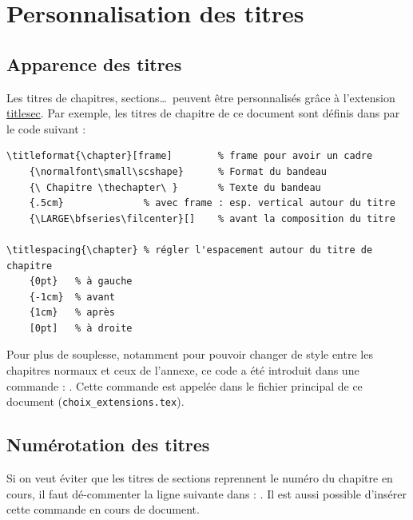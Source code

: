 	
	
	

\section{Personnalisation des titres}



\subsection{Apparence des titres}

Les titres de chapitres, sections\dots \ peuvent être personnalisés grâce à l'extension \href{http://mirror.ctan.org/macros/latex/contrib/titlesec/titlesec.pdf}{titlesec}. Par exemple, les titres de chapitre de ce document sont définis dans  par le code suivant :

\begin{verbatim}
\titleformat{\chapter}[frame]        % frame pour avoir un cadre
    {\normalfont\small\scshape}      % Format du bandeau
    {\ Chapitre \thechapter\ }       % Texte du bandeau
    {.5cm}              % avec frame : esp. vertical autour du titre
    {\LARGE\bfseries\filcenter}[]    % avant la composition du titre

\titlespacing{\chapter} % régler l'espacement autour du titre de chapitre
    {0pt}   % à gauche
    {-1cm}  % avant
    {1cm}   % après
    [0pt]   % à droite
\end{verbatim}

Pour plus de souplesse, notamment pour pouvoir changer de style entre les chapitres normaux et ceux de l'annexe, ce code a été introduit dans une commande : \texttt{\newcommand{\chapterFormat}{...}}. Cette commande est appelée dans le fichier principal de ce document (\texttt{choix_extensions.tex}).



\subsection{Numérotation des titres}

Si on veut éviter que les titres de sections reprennent le numéro du chapitre en cours, il faut dé-commenter la ligne suivante dans  : \texttt{\renewcommand{\thesection}{\arabic{section}}}. Il est aussi possible d'insérer cette commande en cours de document.





